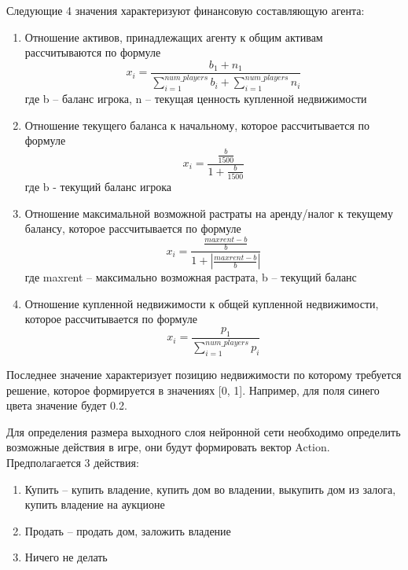 Следующие 4 значения характеризуют финансовую составляющую агента:
\begin{enumerate}
    \item Отношение активов, принадлежащих агенту к общим активам рассчитываются по формуле 
    \begin{equation}
        x_i = \frac{b_1+n_1}{\sum_{i=1}^{num\_players}b_i + \sum_{i=1}^{num\_players}n_i}
    \end{equation}
    где b – баланс игрока, n – текущая ценность купленной недвижимости
    \item Отношение текущего баланса к начальному, которое рассчитывается по формуле
    \begin{equation}
        x_i = \frac{\frac{b}{1500}}{1+\frac{b}{1500}}
    \end{equation}
    где b -  текущий баланс игрока
    \item Отношение максимальной возможной растраты на аренду/налог к текущему балансу, которое рассчитывается по формуле
    \begin{equation}
        x_i = \frac{\frac{maxrent-b}{b}}{1+|\frac{maxrent-b}{b}|}
    \end{equation}    
    где maxrent – максимально возможная растрата, b – текущий баланс
    \item Отношение купленной недвижимости к общей купленной недвижимости, которое рассчитывается по формуле
    \begin{equation}
        x_i = \frac{p_1}{\sum_{i=1}^{num\_players}p_i}
    \end{equation}
\end{enumerate}

Последнее значение характеризует позицию недвижимости по которому требуется решение, которое формируется в значениях [0, 1]. Например, для поля синего цвета значение будет 0.2.

Для определения размера выходного слоя нейронной сети необходимо определить возможные действия в игре, они будут формировать вектор Action. Предполагается 3 действия:
\begin{spacing}{0.9}
\begin{enumerate}
    \item Купить – купить владение, купить дом во владении, выкупить дом из залога, купить владение на аукционе
    \item Продать – продать дом, заложить владение
    \item Ничего не делать
\end{enumerate}
\end{spacing}
